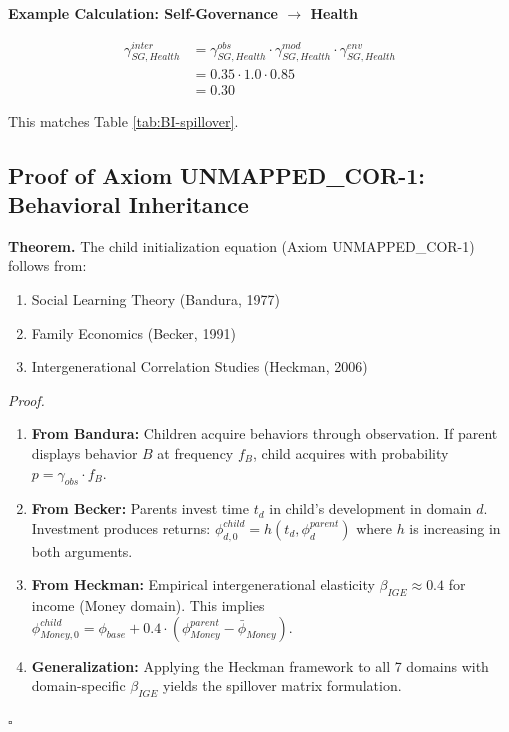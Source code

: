 \textbf{Example Calculation: Self-Governance $\rightarrow$ Health}

\begin{align}
\gamma^{inter}_{SG,Health} &= \gamma^{obs}_{SG,Health} \cdot \gamma^{mod}_{SG,Health} \cdot \gamma^{env}_{SG,Health} \\
&= 0.35 \cdot 1.0 \cdot 0.85 \\
&= 0.30
\end{align}

This matches Table \ref{tab:BI-spillover}.

\subsection{Proof of Axiom UNMAPPED_COR-1: Behavioral Inheritance}

\begin{tcolorbox}[colback=green!5!white, colframe=green!75!black, title=Theorem BI-T1: Behavioral Inheritance Derivation]
\textbf{Theorem.} The child initialization equation (Axiom UNMAPPED_COR-1) follows from:
\begin{enumerate}[nosep]
\item Social Learning Theory (Bandura, 1977)
\item Family Economics (Becker, 1991)
\item Intergenerational Correlation Studies (Heckman, 2006)
\end{enumerate}

\textit{Proof.}
\begin{enumerate}
\item \textbf{From Bandura:} Children acquire behaviors through observation.
      If parent displays behavior $B$ at frequency $f_B$, child acquires with probability $p = \gamma_{obs} \cdot f_B$.

\item \textbf{From Becker:} Parents invest time $t_d$ in child's development in domain $d$.
      Investment produces returns: $\phi^{child}_{d,0} = h(t_d, \phi^{parent}_d)$ where $h$ is increasing in both arguments.

\item \textbf{From Heckman:} Empirical intergenerational elasticity $\beta_{IGE} \approx 0.4$ for income (Money domain).
      This implies $\phi^{child}_{Money,0} = \phi_{base} + 0.4 \cdot (\phi^{parent}_{Money} - \bar{\phi}_{Money})$.

\item \textbf{Generalization:} Applying the Heckman framework to all 7 domains with domain-specific $\beta_{IGE}$ yields
      the spillover matrix formulation.
\end{enumerate}
\hfill $\square$
\end{tcolorbox}

